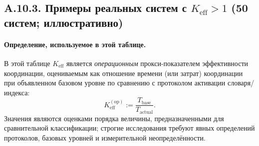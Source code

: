 \documentclass[11pt,a4paper]{article}
\newcommand{\Keff}{K_{\mathrm{eff}}}
\begin{document}
	\subsection*{A.10.3. Примеры реальных систем с $\Keff>1$ (50 систем; иллюстративно)}
	
	\paragraph{Определение, используемое в этой таблице.}
	В этой таблице $K_{\mathrm{eff}}$ является \emph{операционным} прокси-показателем эффективности координации, оцениваемым как отношение времени (или затрат) координации при объявленном базовом уровне по сравнению с протоколом активации словаря/индекса:
	$$
	K_{\mathrm{eff}}^{(\mathrm{op})} := \frac{T_{\mathrm{base}}}{T_{\mathrm{actual}}}.
	$$
	Значения являются оценками порядка величины, предназначенными для сравнительной классификации; строгие исследования требуют явных определений протоколов, базовых уровней и измерительной неопределённости.
	
\end{document}
